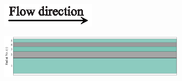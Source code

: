 \documentclass[preprint,12pt]{elsarticle}
\begin{document}
\begin{figure}
     \centering
     \begin{subfigure}[b]{\textwidth}
     	\includegraphics[width=\textwidth]{flow_dir.eps}
     \end{subfigure}
     \begin{subfigure}[b]{0.85\textwidth}
\includegraphics[width=\textwidth]{results/segments/5segEq/50C50T/seg.png}
     \end{subfigure}
     \hfill
     \begin{subfigure}[b]{0.1\textwidth}

\end{subfigure}
\end{figure}
\end{document}
